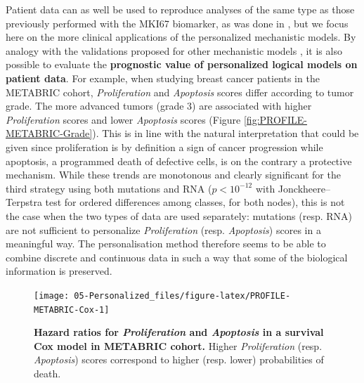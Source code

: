 \documentclass[a4paper,12pt,twoside,onecolumn,openright,final,oldfontcommands]{memoir}
\begin{document}
Patient data can as well be used to reproduce analyses of the same type
as those previously performed with the MKI67 biomarker, as was done in
\citet{beal2019personalization}, but we focus here on the more clinical
applications of the personalized mechanistic models. By analogy with the
validations proposed for other mechanistic models
\citep{fey2015signaling}, it is also possible to evaluate the
\textbf{prognostic value of personalized logical models on patient
data}. For example, when studying breast cancer patients in the METABRIC
cohort, \emph{Proliferation} and \emph{Apoptosis} scores differ
according to tumor grade. The more advanced tumors (grade 3) are
associated with higher \emph{Proliferation} scores and lower
\emph{Apoptosis} scores (Figure \ref{fig:PROFILE-METABRIC-Grade}). This
is in line with the natural interpretation that could be given since
proliferation is by definition a sign of cancer progression while
apoptosis, a programmed death of defective cells, is on the contrary a
protective mechanism. While these trends are monotonous and clearly
significant for the third strategy using both mutations and RNA
(\(p<10^{-12}\) with Jonckheere--Terpstra test for ordered differences
among classes, for both nodes), this is not the case when the two types
of data are used separately: mutations (resp. RNA) are not sufficient to
personalize \emph{Proliferation} (resp. \emph{Apoptosis}) scores in a
meaningful way. The personalisation method therefore seems to be able to
combine discrete and continuous data in such a way that some of the
biological information is preserved.

\begin{figure}

{\centering \texttt{[image: 05-Personalized\_files/figure-latex/PROFILE-METABRIC-Cox-1]} 

}

\caption[Hazard ratios for \emph{Proliferation} and \emph{Apoptosis} in a survival Cox model in METABRIC cohort]{\textbf{Hazard ratios for
\emph{Proliferation} and \emph{Apoptosis} in a survival Cox model in
METABRIC cohort.} Higher \emph{Proliferation} (resp. \emph{Apoptosis})
scores correspond to higher (resp. lower) probabilities of death.}\label{fig:PROFILE-METABRIC-Cox}
\end{figure}
\end{document}
